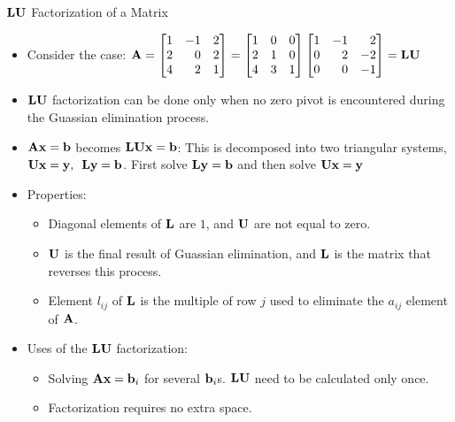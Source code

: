 \documentclass[aspectratio=169]{beamer}
\def\mf{\ensuremath\mathbf}
\begin{document}
\begin{frame}[t]{$\mf{LU}$ Factorization of a Matrix}
\vspace{-0.25cm}
\begin{small}
\begin{itemize}
    \item Consider the case: $\mf{A} = \begin{bmatrix*}[r]
    1 & -1 & 2\\
    2 & 0 & 2\\
    4 & 2 & 1
    \end{bmatrix*} = \begin{bmatrix*}[r]
    1 & 0 & 0\\
    2 & 1 & 0\\
    4 & 3 & 1
    \end{bmatrix*} \begin{bmatrix*}[r]
    1 & -1 & 2\\
    0 & 2 & -2\\
    0 & 0 & -1
    \end{bmatrix*} = \mf{LU}$
    \item $\mf{LU}$ factorization can be done only when no zero pivot is encountered during the Guassian elimination process.
    \item $\mf{Ax = b}$  becomes $\mf{LUx = b}$: This is decomposed into two triangular systems, $\mf{Ux = y}, \,\,\, \mf{Ly = b}$. First solve $\mf{Ly = b}$ and then solve $\mf{Ux = y}$
    \item Properties:
    \begin{itemize}
        \item Diagonal elements of $\mf{L}$ are $1$, and $\mf{U}$ are not equal to zero.
        \item $\mf{U}$ is the final result of Guassian elimination, and $\mf{L}$ is the matrix that reverses this process.
        \item Element $l_{ij}$ of $\mf{L}$ is the multiple of row $j$ used to eliminate the $a_{ij}$ element of $\mf{A}$. 
    \end{itemize}
    \item Uses of the $\mf{LU}$ factorization:
    \begin{itemize}
        \item Solving $\mf{Ax} = \mf{b}_i$ for several $\mf{b}_i$s. $\mf{LU}$ need to be calculated only once.
        \item Factorization requires no extra space.
    \end{itemize}
\end{itemize}
\end{small}
\end{frame}
\end{document}
